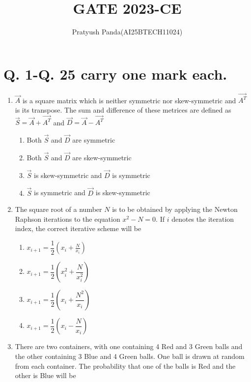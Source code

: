 \documentclass[journal,12pt,onecolumn]{IEEEtran}
\theoremstyle{remark}
\begin{document}
\title{GATE 2023-CE}
\author{Pratyush Panda(AI25BTECH11024)}
\maketitle

\renewcommand{\thefigure}{\theenumi}
\renewcommand{\thetable}{\theenumi}

\section*{Q. 1-Q. 25 carry one mark each.}

\begin{enumerate}
\item $\Vec{A}$  is a square matrix which is neither symmetric nor skew-symmetric and $\Vec{A^T}$ is its transpose. The sum and difference of these metrices are defined as $\Vec{S}=\Vec{A}+\Vec{A^T}$ and $\Vec{D}=\Vec{A}-\Vec{A^T}$

\hfill{}
\begin{enumerate}
\item Both $\Vec{S}$ and $\Vec{D}$ are symmetric
\item Both $\Vec{S}$ and $\Vec{D}$ are skew-symmetric
\item $\vec{S}$ is skew-symmetric and $\vec{D}$ is symmetric
\item $\vec{S}$ is symmetric and $\vec{D}$ is skew-symmetric
\end{enumerate}

\item The square root of a number $N$ is to be obtained by applying the Newton Raphson iterations to the equation $x^2 - N = 0$. If $i$ denotes the iteration index, the correct iterative scheme will be

\hfill{}
\begin{enumerate}
\item $x_{i+1} = \dfrac{1}{2} \left( x_i+\frac{N}{x_i}\right)$
\item $x_{i+1} = \dfrac{1}{2} \left( x_i^2+\dfrac{N}{x_i^2}\right)$
\item $x_{i+1} = \dfrac{1}{2} \left( x_i+\dfrac{N^2}{x_i}\right)$
\item $x_{i+1} = \dfrac{1}{2} \left( x_i-\dfrac{N}{x_i}\right)$
\end{enumerate}

\item There are two containers, with one containing 4 Red and 3 Green balls and the other containing 3 Blue and 4 Green balls. One ball is drawn at random from each container. The probability that one of the balls is Red and the other is Blue will be


\end{enumerate}
\end{document}
